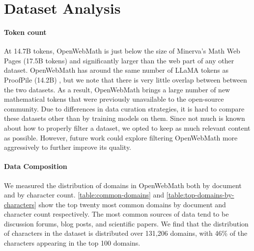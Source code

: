 \section{Dataset Analysis}

\paragraph{Token count} At 14.7B tokens, OpenWebMath is just below the size of Minerva's Math Web Pages (17.5B tokens) \citet{lewkowycz2022solving} and significantly larger than the web part of any other dataset. OpenWebMath has around the same number of LLaMA tokens as ProofPile (14.2B) \citep{azerbayev2023proofnet}, but we note that there is very little overlap between between the two datasets. As a result, OpenWebMath brings a large number of new mathematical tokens that were previously unavailable to the open-source community. Due to differences in data curation strategies, it is hard to compare these datasets other than by training models on them. Since not much is known about how to properly filter a dataset, we opted to keep as much relevant content as possible. However, future work could explore filtering OpenWebMath more aggressively to further improve its quality.

\paragraph{Data Composition} We measured the distribution of domains in OpenWebMath both by document and by character count. \autoref{table:common-domains} and \autoref{table:top-domains-by-characters} show the top twenty most common domains by document and character count respectively. The most common sources of data tend to be discussion forums, blog posts, and scientific papers. We find that the distribution of characters in the dataset is distributed over 131,206 domains, with 46\% of the characters appearing in the top 100 domains.



